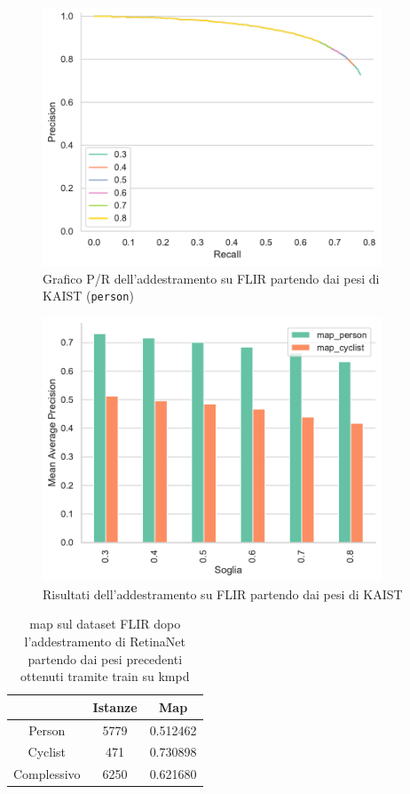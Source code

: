 \begin{figure}[]
    \centering
    \includegraphics[width=0.9\textwidth]{images/graphic/flir_from_kaist_pr.pdf}
    \caption{Grafico P/R dell'addestramento su FLIR partendo dai pesi di KAIST (\texttt{person})}
    \label{fig:flir_train_from_kaist_pr}
\end{figure}
\begin{figure}[]
    \centering
    \includegraphics[width=0.9\textwidth]{images/graphic/flir_from_kaist_result.pdf}
    \caption{Risultati dell'addestramento su FLIR partendo dai pesi di KAIST}
    \label{fig:flir_train_from_kaist_result}
\end{figure}
\begin{table}[]
    \centering
    \begin{tabular}{c|c|c|}
    \cline{2-3}
     & Istanze & Map \\ \hline
    \multicolumn{1}{|c|}{Person} & 5779 & 0.512462 \\ \hline
    \multicolumn{1}{|c|}{Cyclist} & 471 & 0.730898 \\ \hline
    \multicolumn{1}{|c|}{Complessivo} & 6250 & 0.621680 \\ \hline
    \end{tabular}
    \caption{\ac{map} sul dataset FLIR dopo l'addestramento di RetinaNet partendo dai pesi precedenti ottenuti tramite train su \ac{kmpd}}
    \label{table:best_flir_from_kaist}
\end{table}

